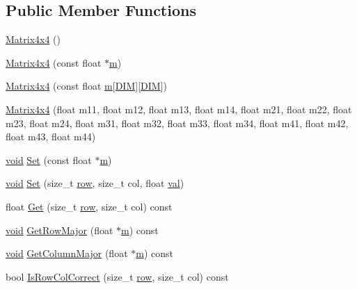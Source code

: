 \subsection*{Public Member Functions}
\begin{DoxyCompactItemize}
\item 
\hyperlink{class_matrix4x4_a714a467ba7f85f88ebe3897b5e3580be}{Matrix4x4} ()
\item 
\hyperlink{class_matrix4x4_a870cfc231c909b9b2eed7de0568470f2}{Matrix4x4} (const float $\ast$\hyperlink{glext_8h_a11941354c1d09e70ec63bde35fc79d4f}{m})
\item 
\hyperlink{class_matrix4x4_a3b0a9ee0e5113c7805c3d0bb54b25460}{Matrix4x4} (const float \hyperlink{glext_8h_a11941354c1d09e70ec63bde35fc79d4f}{m}\mbox{[}\hyperlink{_matrix4x4_8h_ac25189db92959bff3c6c2adf4c34b50a}{D\+I\+M}\mbox{]}\mbox{[}\hyperlink{_matrix4x4_8h_ac25189db92959bff3c6c2adf4c34b50a}{D\+I\+M}\mbox{]})
\item 
\hyperlink{class_matrix4x4_a800b92eacd31be52d0ad1c52d74bd16a}{Matrix4x4} (float m11, float m12, float m13, float m14, float m21, float m22, float m23, float m24, float m31, float m32, float m33, float m34, float m41, float m42, float m43, float m44)
\item 
\hyperlink{wglext_8h_a9e6b7f1933461ef318bb000d6bd13b83}{void} \hyperlink{class_matrix4x4_acb07f122201caa230eccaeb1688a7bb2}{Set} (const float $\ast$\hyperlink{glext_8h_a11941354c1d09e70ec63bde35fc79d4f}{m})
\item 
\hyperlink{wglext_8h_a9e6b7f1933461ef318bb000d6bd13b83}{void} \hyperlink{class_matrix4x4_a1e52f1eba7ea388bbca497a988e6db3f}{Set} (size\+\_\+t \hyperlink{glext_8h_a90d3e7e4182a9630993f640fa0443b0b}{row}, size\+\_\+t col, float \hyperlink{glext_8h_a26942fd2ed566ef553eae82d2c109c8f}{val})
\item 
float \hyperlink{class_matrix4x4_a2fa8d389f00e100783d96dca2841dcd9}{Get} (size\+\_\+t \hyperlink{glext_8h_a90d3e7e4182a9630993f640fa0443b0b}{row}, size\+\_\+t col) const 
\item 
\hyperlink{wglext_8h_a9e6b7f1933461ef318bb000d6bd13b83}{void} \hyperlink{class_matrix4x4_a1ac1a48d82ace2c2ac98c2bb86ff7b5f}{Get\+Row\+Major} (float $\ast$\hyperlink{glext_8h_a11941354c1d09e70ec63bde35fc79d4f}{m}) const 
\item 
\hyperlink{wglext_8h_a9e6b7f1933461ef318bb000d6bd13b83}{void} \hyperlink{class_matrix4x4_a5868dcbb00ef438b651a90ac0950f93c}{Get\+Column\+Major} (float $\ast$\hyperlink{glext_8h_a11941354c1d09e70ec63bde35fc79d4f}{m}) const 
\item 
bool \hyperlink{class_matrix4x4_a3cfb5cb29c3afa4bff1514fdfd1551c0}{Is\+Row\+Col\+Correct} (size\+\_\+t \hyperlink{glext_8h_a90d3e7e4182a9630993f640fa0443b0b}{row}, size\+\_\+t col) const 
\end{DoxyCompactItemize}
